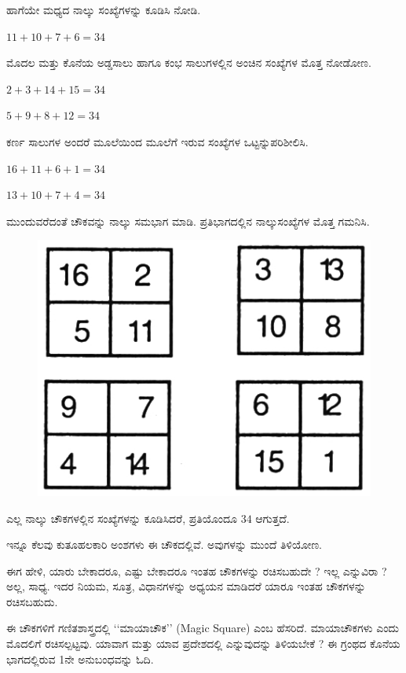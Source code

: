 ಹಾಗೆಯೇ ಮಧ್ಯದ ನಾಲ್ಕು ಸಂಖ್ಯೆಗಳನ್ನು ಕೂಡಿಸಿ ನೋಡಿ.

$11+10+7+6 = 34$

ಮೊದಲ ಮತ್ತು ಕೊನೆಯ ಅಡ್ಡಸಾಲು ಹಾಗೂ ಕಂಭ ಸಾಲುಗಳಲ್ಲಿನ ಅಂಚಿನ ಸಂಖ್ಯೆಗಳ ಮೊತ್ತ ನೋಡೋಣ.

$2+3+14+15 = 34$

$5+9+8+12 = 34$

ಕರ್ಣ ಸಾಲುಗಳ ಅಂದರೆ ಮೂಲೆಯಿಂದ ಮೂಲೆಗೆ ಇರುವ ಸಂಖ್ಯೆಗಳ ಒಟ್ಟನ್ನು\break ಪರಿಶೀಲಿಸಿ.

$16+11+6+1 = 34$

$13+10+7+4 = 34$

ಮುಂದುವರೆದಂತೆ ಚೌಕವನ್ನು ನಾಲ್ಕು ಸಮಭಾಗ ಮಾಡಿ. ಪ್ರತಿಭಾಗದಲ್ಲಿನ ನಾಲ್ಕು\break ಸಂಖ್ಯೆಗಳ ಮೊತ್ತ ಗಮನಿಸಿ.
\begin{figure}[H]
\includegraphics[scale=.9]{src/figures/chap1/fig1.2.jpg}
\end{figure}
ಎಲ್ಲ ನಾಲ್ಕು ಚೌಕಗಳಲ್ಲಿನ ಸಂಖ್ಯೆಗಳನ್ನು ಕೂಡಿಸಿದರೆ, ಪ್ರತಿಯೊಂದೂ $34$ ಆಗುತ್ತದೆ.

ಇನ್ನೂ ಕೆಲವು ಕುತೂಹಲಕಾರಿ ಅಂಶಗಳು ಈ ಚೌಕದಲ್ಲಿವೆ. ಅವುಗಳನ್ನು ಮುಂದೆ ತಿಳಿಯೋಣ.

ಈಗ ಹೇಳಿ, ಯಾರು ಬೇಕಾದರೂ, ಎಷ್ಟು ಬೇಕಾದರೂ ಇಂತಹ ಚೌಕಗಳನ್ನು ರಚಿಸ\-ಬಹುದೇ ? ಇಲ್ಲ ಎನ್ನುವಿರಾ ? ಅಲ್ಲ, ಸಾಧ್ಯ. ಇದರ ನಿಯಮ, ಸೂತ್ರ, ವಿಧಾನಗಳನ್ನು ಅಧ್ಯಯನ ಮಾಡಿದರೆ ಯಾರೂ ಇಂತಹ ಚೌಕಗಳನ್ನು ರಚಿಸಬಹುದು.

ಈ ಚೌಕಗಳಿಗೆ ಗಣಿತಶಾಸ್ತ್ರದಲ್ಲಿ ‘‘ಮಾಯಾಚೌಕ’’ (Magic Square) ಎಂಬ ಹೆಸರಿದೆ. ಮಾಯಾಚೌಕಗಳು ಎಂದು ಮೊದಲಿಗೆ ರಚಿಸಲ್ಪಟ್ಟವು. ಯಾವಾಗ ಮತ್ತು ಯಾವ ಪ್ರದೇಶದಲ್ಲಿ ಎನ್ನುವುದನ್ನು ತಿಳಿಯಬೇಕೆ ? ಈ ಗ್ರಂಥದ ಕೊನೆಯ ಭಾಗದಲ್ಲಿರುವ 1ನೇ ಅನುಬಂಧವನ್ನು ಓದಿ.
